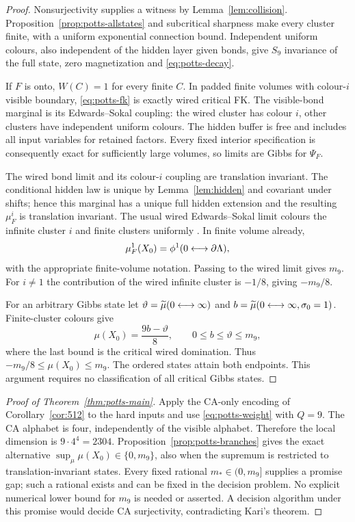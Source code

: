 \begin{proof}
Nonsurjectivity supplies a witness by Lemma~\ref{lem:collision}. Proposition~\ref{prop:potts-allstates} and subcritical sharpness make every cluster finite, with a uniform exponential connection bound. Independent uniform colours, also independent of the hidden layer given bonds, give $S_9$ invariance of the full state, zero magnetization and \eqref{eq:potts-decay}.

If $F$ is onto, $W(C)=1$ for every finite $C$. In padded finite volumes with colour-$i$ visible boundary, \eqref{eq:potts-fk} is exactly wired critical FK. The visible-bond marginal is its Edwards--Sokal coupling: the wired cluster has colour $i$, other clusters have independent uniform colours. The hidden buffer is free and includes all input variables for retained factors. Every fixed interior specification is consequently exact for sufficiently large volumes, so limits are Gibbs for $\Psi_F$.

The wired bond limit and its colour-$i$ coupling are translation invariant. The conditional hidden law is unique by Lemma~\ref{lem:hidden} and covariant under shifts; hence this marginal has a unique full hidden extension and the resulting $\mu_F^i$ is translation invariant. The usual wired Edwards--Sokal limit colours the infinite cluster $i$ and finite clusters uniformly \cite[Theorems 4.91 and 5.17]{Grimmett}. In finite volume already,
\[
 \mu_F^1(X_0)=\phi^1(0\longleftrightarrow\partial\Lambda),
\]
with the appropriate finite-volume notation. Passing to the wired limit gives $m_9$. For $i\ne1$ the contribution of the wired infinite cluster is $-1/8$, giving $-m_9/8$.

For an arbitrary Gibbs state let $\vartheta=\widetilde\mu(0\longleftrightarrow\infty)$ and
$b=\widetilde\mu(0\longleftrightarrow\infty,\sigma_0=1)$. Finite-cluster colours give
\[
 \mu(X_0)=\frac{9b-\vartheta}{8},\qquad
 0\le b\le\vartheta\le m_9,
\]
where the last bound is the critical wired domination. Thus
$-m_9/8\le\mu(X_0)\le m_9$. The ordered states attain both endpoints. This argument requires no classification of all critical Gibbs states.
\end{proof}

\begin{proof}[Proof of Theorem~\ref{thm:potts-main}]
Apply the CA-only encoding of Corollary~\ref{cor:512} to the hard inputs and use \eqref{eq:potts-weight} with $Q=9$. The CA alphabet is four, independently of the visible alphabet. Therefore the local dimension is $9\cdot4^4=2304$. Proposition~\ref{prop:potts-branches} gives the exact alternative $\sup_\mu\mu(X_0)\in\{0,m_9\}$, also when the supremum is restricted to translation-invariant states. Every fixed rational $m_*\in(0,m_9]$ supplies a promise gap; such a rational exists and can be fixed in the decision problem. No explicit numerical lower bound for $m_9$ is needed or asserted. A decision algorithm under this promise would decide CA surjectivity, contradicting Kari's theorem.
\end{proof}

